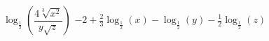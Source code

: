 {$\log_{\frac{1}{2}}\left(\dfrac{4\sqrt[3]{x^2}}{y\sqrt{z}}\right)$}
{$-2+\frac{2}{3}\log_{\frac{1}{2}}(x)-\log_{\frac{1}{2}}(y)-\frac{1}{2}\log_{\frac{1}{2}}(z)$}


